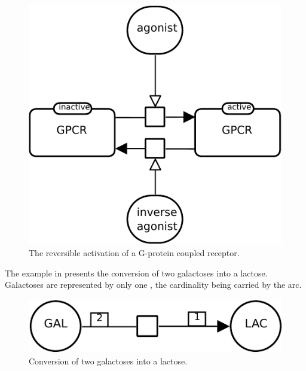 \begin{figure}[H]
  \centering
  \includegraphics[scale = 0.8]{images/build/process_modulated_example.pdf}
  \caption{The reversible activation of a G-protein coupled receptor.}
  \label{fig:trans-mod}
\end{figure}

The example in  presents the conversion of two galactoses into a lactose.  Galactoses are represented by only one , the cardinality being carried by the  arc.

\begin{figure}[H]
  \centering
  \includegraphics[scale = 0.8]{images/build/process_dimerisation_example.pdf}
  \caption{Conversion of two galactoses into a lactose.}
  \label{fig:trans-dim}
\end{figure}
